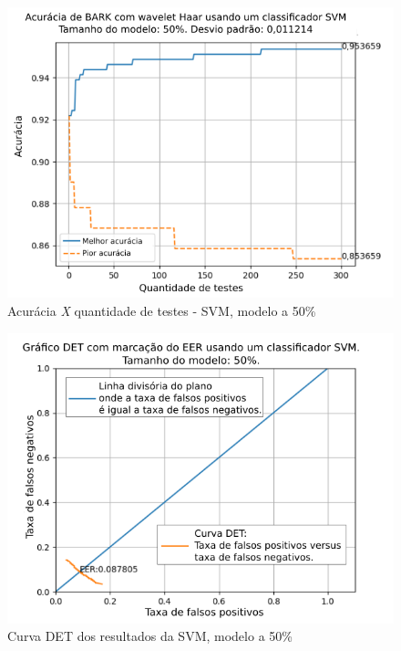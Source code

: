 			

			\begin{figure}[!h]
				\centering
				\includegraphics[width=\linewidth]{images/results/confusionMatrices/classifier_SVM_50.png}
				\caption{Acurácia \textit{X} quantidade de testes - SVM, modelo a 50\%}
				\label{fig:classifiersvm50}
			\end{figure}
		
			\begin{figure}[!h]
				\centering
				\includegraphics[width=.9\linewidth]{images/results/det/DET_SVM_50}
				\caption{Curva DET dos resultados da SVM, modelo a 50\%}
				\label{fig:detsvm50}
			\end{figure}

			\FloatBarrier

